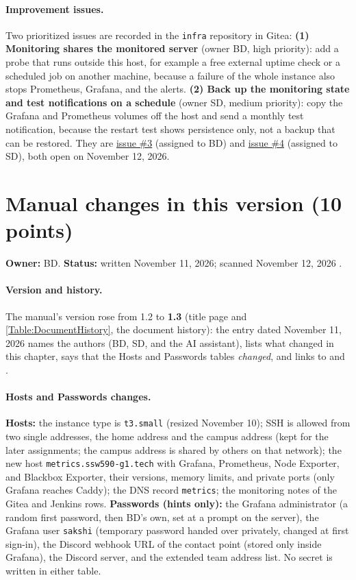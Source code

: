 \paragraph{Improvement issues.} Two prioritized issues are recorded in the \texttt{infra} repository in Gitea: \textbf{(1) Monitoring shares the monitored server} (owner BD, high priority): add a probe that runs outside this
host, for example a free external uptime check or a scheduled job on another machine, because a failure of the whole instance also stops Prometheus, Grafana, and the alerts. \textbf{(2) Back up the monitoring state and test notifications on a schedule}
(owner SD, medium priority): copy the Grafana and Prometheus volumes off the host and send a monthly test notification, because the restart test shows persistence only, not a backup that can be restored.
They are \href{\GiteaURL/group1-startup/infra/issues/3}{issue \#3} (assigned to BD) and \href{\GiteaURL/group1-startup/infra/issues/4}{issue \#4} (assigned to SD), both open on November 12, 2026.

\section{Manual changes in this version (10 points)}\label{Section:sreManual}
\textbf{Owner:} BD. \textbf{Status:} written November 11, 2026; scanned November 12, 2026 \StatusPass.

\paragraph{Version and history.} The manual's version rose from 1.2 to \textbf{1.3} (title page and \ref{Table:DocumentHistory}, the document history): the entry dated November 11, 2026
names the authors (BD, SD, and the AI assistant), lists what changed in this chapter, says that the Hosts and Passwords tables \emph{changed}, and links to  and .

\paragraph{Hosts and Passwords changes.} \textbf{Hosts:} the instance type is \texttt{t3.small} (resized November 10); SSH is allowed from two single addresses, the home address and the campus address (kept for the later assignments;
the campus address is shared by others on that network); the new host \texttt{metrics.ssw590-g1.tech} with Grafana, Prometheus, Node Exporter, and Blackbox Exporter, their versions, memory limits, and private ports (only Grafana reaches Caddy);
the DNS record \texttt{metrics}; the monitoring notes of the Gitea and Jenkins rows. \textbf{Passwords (hints only):} the Grafana administrator (a random first password, then BD's own, set at a prompt on the server), the Grafana user \texttt{sakshi}
(temporary password handed over privately, changed at first sign-in), the Discord webhook URL of the contact point (stored only inside Grafana), the Discord server, and the extended team address list. No secret is written in either table.

